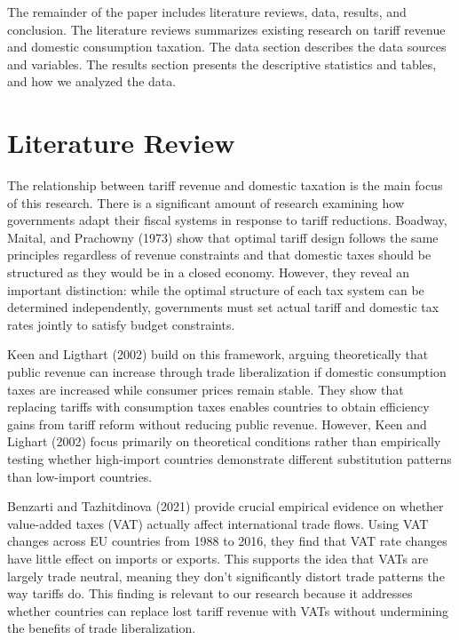 \documentclass[12pt]{article}
\begin{document}
The remainder of the paper includes literature reviews, data, results, and conclusion.  The literature reviews summarizes existing research on tariff revenue and domestic consumption taxation.  The data section describes the data sources and variables.  The results section presents the descriptive statistics and tables, and how we analyzed the data.


\section{Literature Review} \label{sec:literature}

\setlength{\parindent}{20pt}The relationship between tariff revenue and domestic taxation is the main focus of this research. There is a significant amount of research examining how governments adapt their fiscal systems in response to tariff reductions. Boadway, Maital, and Prachowny (1973) show that optimal tariff design follows the same principles regardless of revenue constraints and that domestic taxes should be structured as they would be in a closed economy. However, they reveal an important distinction: while the optimal structure of each tax system can be determined independently, governments must set actual tariff and domestic tax rates jointly to satisfy budget constraints.   

    Keen and Ligthart (2002) build on this framework, arguing theoretically that public revenue can increase through trade liberalization if domestic consumption taxes are increased while consumer prices remain stable. They show that replacing tariffs with consumption taxes enables countries to obtain efficiency gains from tariff reform without reducing public revenue. However, Keen and Lighart (2002) focus primarily on theoretical conditions rather than empirically testing whether high-import countries demonstrate different substitution patterns than low-import countries.   

        Benzarti and Tazhitdinova (2021) provide crucial empirical evidence on whether value-added taxes (VAT) actually affect international trade flows. Using VAT changes across EU countries from 1988 to 2016, they find that VAT rate changes have little effect on imports or exports. This supports the idea that VATs are largely trade neutral, meaning they don't significantly distort trade patterns the way tariffs do. This finding is relevant to our research because it addresses whether countries can replace lost tariff revenue with VATs without undermining the benefits of trade liberalization. 
        
\end{document}
